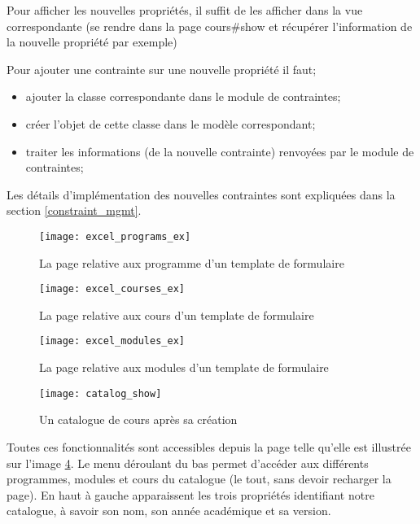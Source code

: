 Pour afficher les nouvelles propriétés, il suffit de les afficher dans la vue correspondante (se rendre dans la page cours\#show et récupérer l'information de la nouvelle propriété par exemple)

Pour ajouter une contrainte sur une nouvelle propriété il faut;
\begin{itemize}
\item ajouter la classe correspondante dans le module de contraintes;
\item créer l'objet de cette classe dans le modèle correspondant;
\item traiter les informations (de la nouvelle contrainte) renvoyées par le module de contraintes;
\end{itemize}

Les détails d'implémentation des nouvelles contraintes sont expliquées dans la section \ref{constraint_mgmt}. 

\begin{figure}
\centering
\caption{La page relative aux programme d'un template de formulaire}
\label{fig:excel_programs_ex}
\texttt{[image: excel\_programs\_ex]}
\end{figure}

\begin{figure}
\centering
\caption{La page relative aux cours d'un template de formulaire}
\label{fig:excel_courses_ex}
\texttt{[image: excel\_courses\_ex]}
\end{figure}

\begin{figure}
\centering
\caption{La page relative aux modules d'un template de formulaire}
\label{fig:excel_modules_ex}
\texttt{[image: excel\_modules\_ex]}
\end{figure}

\begin{figure}[!htb]
\centering
\caption{Un catalogue de cours après sa création}
\label{fig:catalog_show}
\texttt{[image: catalog\_show]}
\end{figure}

Toutes ces fonctionnalités sont accessibles depuis la page telle qu'elle est illustrée sur l'image \ref{fig:catalog_show}. Le menu déroulant du bas permet d'accéder aux différents programmes, modules et cours du catalogue (le tout, sans devoir recharger la page). En haut à gauche apparaissent les trois propriétés identifiant notre catalogue, à savoir son nom, son année académique et sa version. 


